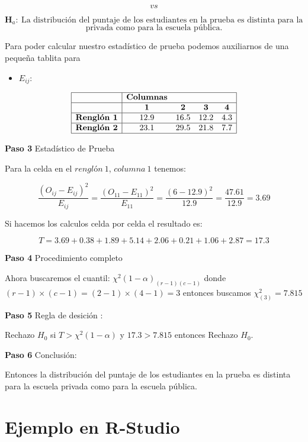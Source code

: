 \documentclass[
  a4paper,
  oneside,
  openany]{book}
\providecommand{\tightlist}{%
  \setlength{\itemsep}{0pt}\setlength{\parskip}{0pt}}
\begin{document}
\[vs\]

\[\textbf{H}_a: \ \mbox{La distribución del puntaje de los estudiantes en la prueba es distinta para la escuela}\]
\[\mbox{privada como para la escuela pública.}\]

Para poder calcular nuestro estadístico de prueba podemos auxiliarnos de una pequeña tablita para

\begin{itemize}
\tightlist
\item
  \(E_{ij}:\)
\end{itemize}

\[
\begin{array}{ |c|cccc|  }
\hline
&\textbf{Columnas} & & &\\
\hline
&\textbf{1} & \textbf{2} & \textbf{3} & \textbf{4} \\
\hline
\textbf{Renglón 1} & 12.9   & 16.5 & 12.2 & 4.3 \\
\hline
\textbf{Renglón 2} & 23.1   & 29.5 & 21.8 & 7.7 \\
\hline
\end{array}
\]

\textbf{Paso 3} Estadístico de Prueba

Para la celda en el \(renglón\ 1\), \(columna\ 1\) tenemos:

\[\frac{(O_{ij}-E_{ij})^2}{E_{ij}}= \frac{(O_{11}-E_{11})^2}{E_{11}}=\frac{(6-12.9)^2}{12.9}=\frac{47.61}{12.9}=3.69\]

Si hacemos los calculos celda por celda el resultado es:

\[T=3.69+0.38+1.89+5.14+2.06+0.21+1.06+2.87=17.3\]

\textbf{Paso 4} Procedimiento completo

Ahora buscaremos el cuantil: \(\chi^2(1-\alpha)_{(r-1)(c-1)}\) donde \((r-1)\times(c-1)=(2-1)\times(4-1)=3\)
entonces buscamos \(\chi^2_{(3)}=7.815\)

\textbf{Paso 5} Regla de desición :

Rechazo \(H_0\) si \(T> \chi^2(1-\alpha)\) y \(17.3> 7.815\) entonces Rechazo \(H_0\).

\textbf{Paso 6} Conclusión:

Entonces la distribución del puntaje de los estudiantes en la prueba es distinta para la escuela privada como para la escuela pública.

\hypertarget{ejemplo-en-r-studio-11}{%
\section{Ejemplo en R-Studio}\label{ejemplo-en-r-studio-11}}
\end{document}
